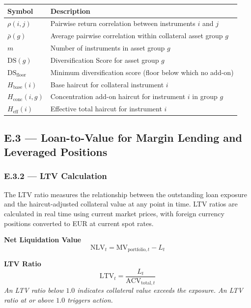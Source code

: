 \documentclass[9pt, a4paper]{extarticle}
\newenvironment{formulabox}{\par\addvspace{4pt}}{\par\addvspace{4pt}}
\newcommand{\vartableheader}{%
    \textbf{Symbol} & \textbf{Description}\\
}
\begin{document}
\begin{tabularx}{\linewidth}{lX}
\toprule
\vartableheader
\midrule
$\rho(i,j)$                      & Pairwise return correlation between instruments $i$ and $j$ \\
$\bar{\rho}(g)$                  & Average pairwise correlation within collateral asset group $g$ \\
$m$                              & Number of instruments in asset group $g$ \\
$\mathrm{DS}(g)$                 & Diversification Score for asset group $g$ \\
$\mathrm{DS}_{\mathrm{floor}}$   & Minimum diversification score (floor below which no add-on) \\
$H_{\mathrm{base}}(i)$           & Base haircut for collateral instrument $i$ \\
$H_{\mathrm{conc}}(i,g)$         & Concentration add-on haircut for instrument $i$ in group $g$ \\
$H_{\mathrm{eff}}(i)$            & Effective total haircut for instrument $i$ \\
\bottomrule
\end{tabularx}

\newpage

\subsection{E.3 — Loan-to-Value for Margin Lending and Leveraged Positions}

\subsubsection{E.3.2 — LTV Calculation}

The LTV ratio measures the relationship between the outstanding loan exposure and
the haircut-adjusted collateral value at any point in time. LTV ratios are
calculated in real time using current market prices, with foreign currency
positions converted to EUR at current spot rates.

\begin{formulabox}
\textbf{Net Liquidation Value}
\begin{equation*}
    \mathrm{NLV}_t = \mathrm{MV}_{\mathrm{portfolio},t} - L_t
\end{equation*}
\end{formulabox}

\begin{formulabox}
\textbf{LTV Ratio}
\begin{equation*}
    \mathrm{LTV}_t =
        \frac{L_t}{\mathrm{ACV}_{\mathrm{total},t}}
\end{equation*}
\textit{An LTV ratio below $1.0$ indicates collateral value exceeds the exposure.
An LTV ratio at or above $1.0$ triggers action.}
\end{formulabox}
\end{document}

